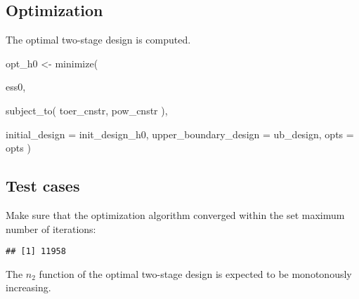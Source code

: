\documentclass[
]{book}
\newenvironment{Shaded}{\begin{snugshade}}{\end{snugshade}}
\newcommand{\AttributeTok}[1]{\textcolor[rgb]{0.77,0.63,0.00}{#1}}
\newcommand{\DecValTok}[1]{\textcolor[rgb]{0.00,0.00,0.81}{#1}}
\newcommand{\FunctionTok}[1]{\textcolor[rgb]{0.00,0.00,0.00}{#1}}
\newcommand{\NormalTok}[1]{#1}
\newcommand{\OtherTok}[1]{\textcolor[rgb]{0.56,0.35,0.01}{#1}}
\newcommand{\SpecialCharTok}[1]{\textcolor[rgb]{0.00,0.00,0.00}{#1}}
\begin{document}
\hypertarget{optimization-14}{%
\subsection{Optimization}\label{optimization-14}}

The optimal two-stage design is computed.

\begin{Shaded}
\begin{Highlighting}[]
\NormalTok{opt\_h0 }\OtherTok{\textless{}{-}} \FunctionTok{minimize}\NormalTok{(}
  
\NormalTok{    ess0,}
    
    \FunctionTok{subject\_to}\NormalTok{(}
\NormalTok{        toer\_cnstr,}
\NormalTok{        pow\_cnstr}
\NormalTok{    ),}
    
    \AttributeTok{initial\_design        =}\NormalTok{ init\_design\_h0,}
    \AttributeTok{upper\_boundary\_design =}\NormalTok{ ub\_design,}
    \AttributeTok{opts =}\NormalTok{ opts )}
\end{Highlighting}
\end{Shaded}

\hypertarget{test-cases-15}{%
\subsection{Test cases}\label{test-cases-15}}

Make sure that the optimization algorithm converged within the set maximum number of iterations:

\begin{Shaded}
\end{Shaded}

\begin{verbatim}
## [1] 11958
\end{verbatim}

The \(n_2\) function of the optimal two-stage design is expected to be monotonously increasing.

\begin{Shaded}
\end{Shaded}
\end{document}
